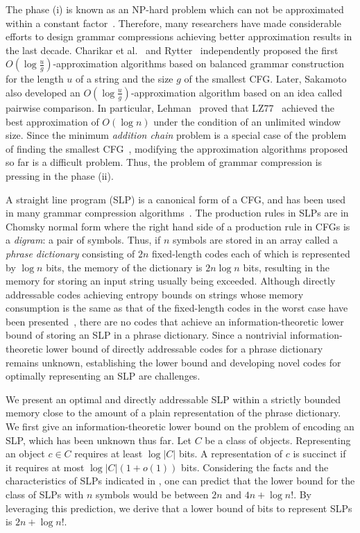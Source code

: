 \documentclass[10pt]{llncs}
\begin{document}
The phase (i) is known as an NP-hard problem which can not be approximated 
within a constant factor~\cite{Lehman-Shelat02}.
Therefore, many researchers have made considerable efforts to design grammar compressions 
achieving better approximation results in the last decade.
Charikar et al.~\cite{Charikar05} and Rytter~\cite{Rytter03} independently 
proposed the first $O(\log\frac{u}{g})$-approximation algorithms based on balanced 
grammar construction for the length $u$ of a string and the size $g$ of the smallest CFG. 
Later, Sakamoto~\cite{Sakamoto05} also developed an $O(\log\frac{u}{g})$-approximation algorithm 
based on an idea called pairwise comparison. 
In particular, Lehman~\cite{Lehman-Shelat02} proved that LZ77~\cite{LZ77} 
achieved the best approximation of $O(\log{n})$ under the condition of an unlimited window size.
Since the minimum {\em addition chain} problem is a special case of the problem 
of finding the smallest CFG~\cite{LehmanPhD}, modifying the approximation algorithms proposed so far is a difficult problem. 
Thus, the problem of grammar compression is pressing in the phase (ii). 

A straight line program (SLP) is a canonical form of a CFG, 
and has been used in many grammar compression algorithms~\cite{LZ78,Larsson00,LZ77,Apostolico00,ESP}.
The production rules in SLPs are in Chomsky normal form 
where the right hand side of a production rule in CFGs is a {\em digram}: a pair of symbols.
Thus, if $n$ symbols are stored in an array called a {\em phrase dictionary} 
consisting of $2n$ fixed-length codes each of which is represented by $\log{n}$ bits, 
the memory of the dictionary is $2n \log{n}$ bits, resulting in the memory for storing an input string usually being exceeded.
Although directly addressable codes achieving entropy bounds on strings whose memory consumption is the same as that of the fixed-length codes in the worst case have been presented~\cite{ferragina2007simple,sadakane2006squeezing,gonzalez2006statistical}, 
there are no codes that achieve an information-theoretic lower bound of storing an SLP in a phrase dictionary.
Since a nontrivial information-theoretic lower bound of directly addressable codes for a phrase dictionary remains unknown, 
establishing the lower bound and developing novel codes for optimally representing an SLP are challenges.


We present an optimal and directly addressable SLP within a strictly bounded memory close to 
the amount of a plain representation of the phrase dictionary.
We first give an information-theoretic lower bound on the problem of encoding an SLP, 
which has been unknown thus far. 
Let $C$ be a class of objects.
Representing an object $c \in C$ requires at least $\log|C|$ bits.
A representation of $c$ is succinct if it requires at most $\log{|C|}(1+o(1))$ bits.
Considering the facts and the characteristics of SLPs indicated in \cite{ESP}, 
one can predict that the lower bound for the class of SLPs with $n$ symbols 
would be between $2n$ and $4n+\log{n!}$. 
By leveraging this prediction, we derive that a lower bound of bits to represent SLPs is $2n+\log{n!}$.
\end{document}
